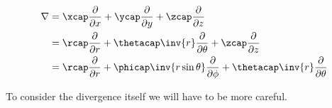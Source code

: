 \begin{align}\label{eqn:foo9}
\grad 
&= \xcap \PD{x}{} +\ycap \PD{y}{} +\zcap \PD{z}{} \\
&= \rcap \PD{r}{} +\thetacap \inv{r} \PD{\theta}{} + \zcap \PD{z}{} \\
&= \rcap \PD{r}{} +\phicap \inv{r \sin\theta} \PD{\phi}{} +\thetacap \inv{r} \PD{\theta}{} 
\end{align}

To consider the divergence itself we will have to be more careful.

\EndNoBibArticle
